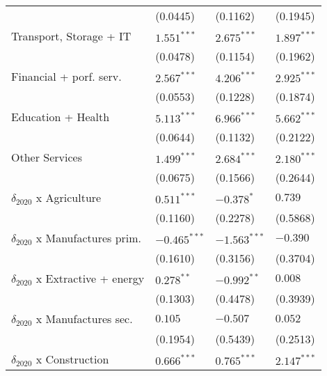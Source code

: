 \begin{tabular}{llll}
                                                   &        (0.0445) &        (0.1162) &        (0.1945) \\
Transport, Storage + IT                            &   $1.551^{***}$ &   $2.675^{***}$ &   $1.897^{***}$ \\
                                                   &        (0.0478) &        (0.1154) &        (0.1962) \\
Financial + porf. serv.                            &   $2.567^{***}$ &   $4.206^{***}$ &   $2.925^{***}$ \\
                                                   &        (0.0553) &        (0.1228) &        (0.1874) \\
Education + Health                                 &   $5.113^{***}$ &   $6.966^{***}$ &   $5.662^{***}$ \\
                                                   &        (0.0644) &        (0.1132) &        (0.2122) \\
Other Services                                     &   $1.499^{***}$ &   $2.684^{***}$ &   $2.180^{***}$ \\
                                                   &        (0.0675) &        (0.1566) &        (0.2644) \\
$\delta_{2020}$ x Agriculture                      &   $0.511^{***}$ &      $-0.378^*$ &         $0.739$ \\
                                                   &        (0.1160) &        (0.2278) &        (0.5868) \\
$\delta_{2020}$ x Manufactures prim.               &  $-0.465^{***}$ &  $-1.563^{***}$ &        $-0.390$ \\
                                                   &        (0.1610) &        (0.3156) &        (0.3704) \\
$\delta_{2020}$ x Extractive + energy              &    $0.278^{**}$ &   $-0.992^{**}$ &         $0.008$ \\
                                                   &        (0.1303) &        (0.4478) &        (0.3939) \\
$\delta_{2020}$ x Manufactures sec.                &         $0.105$ &        $-0.507$ &         $0.052$ \\
                                                   &        (0.1954) &        (0.5439) &        (0.2513) \\
$\delta_{2020}$ x Construction                     &   $0.666^{***}$ &   $0.765^{***}$ &   $2.147^{***}$ \\

\end{tabular}
